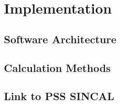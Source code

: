 \chapter{Implementation}

\section{Software Architecture}

\section{Calculation Methods}

\section{Link to PSS SINCAL}